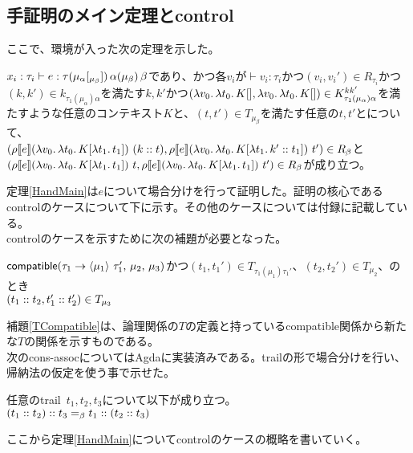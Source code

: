 \subsection{手証明のメイン定理とcontrol}
ここで、環境が入った次の定理を示した。
\begin{theorem}
  $x_i:\tau_i \vdash e:\tau \TrailsType{\alpha}{\beta} \TrailType{\beta}$であり、かつ各$v_i$が$\vdash v_i:\tau_i$かつ$(v_i,v_i') \in R_{\tau_i}$かつ$(k,k')\in k_{\tau_1(\mu_{\alpha})\alpha}$を満たす$k,k'$かつ$(\Lam{v_0}{\Lam{t_0}{K[]}}, \Lam{v_0}{\Lam{t_0}{K[]}})\in  K^{kk'}_{\tau_1(\mu_{\alpha})\alpha}$を満たすような任意のコンテキスト$K$と、$(t, t') \in T_{\mu_{\beta}}$を満たす任意の$t, t'$とについて、\\
  $(\rho \CPSTh{e} \LamP{v_0}{\Lam{t_0}{K[\Lam{t_1}{t_1}]}}\ \ConsP{k}{t}, \rho \CPSTh{e} \LamP{v_0}{\Lam{t_0}{K[\Lam{t_1}{\Cons{k'}{t_1}}]}}\ t')\in R_{\beta}$と\\
  $(\rho \CPSTh{e} \LamP{v_0}{\Lam{t_0}{K[\Lam{t_1}{t_1}]}}\ t, \rho \CPSTh{e} \LamP{v_0}{\Lam{t_0}{K[\Lam{t_1}{t_1}]}}\ t')\in R_{\beta}$が成り立つ。
\label{HandMain}
\end{theorem}
定理\ref{HandMain}は$e$について場合分けを行って証明した。証明の核心であるcontrolのケースについて下に示す。その他のケースについては付録に記載している。\\
controlのケースを示すために次の補題が必要となった。
\begin{lemma}
  $\Compatible{\Trail{\tau_1}{\tau_1'}{\mu_1}}{\mu_2}{\mu_3}$かつ$(t_1, t_1')\in T_{\tau_1(\mu_1)\tau_1'}、(t_2, t_2')\in T_{\mu_2}、$のとき\\
  $(\Cons{t_1}{t_2}, \Cons{t_1'}{t_2'})\in T_{\mu_3}$
\label{TCompatible}
\end{lemma}
補題\ref{TCompatible}は、論理関係の$T$の定義と持っている\textsf{compatible}関係から新たな$T$の関係を示すものである。\\
次の\textsf{cons-assoc}についてはAgdaに実装済みである。trailの形で場合分けを行い、帰納法の仮定を使う事で示せた。
\begin{lemma}
  任意のtrail\ $t_1,t_2,t_3$について以下が成り立つ。\\
  $\Cons{\ConsP{t_1}{t_2}}{t_3} =_{\beta} \Cons{t_1}{\ConsP{t_2}{t_3}}$
\label{ConsAssoc}
\end{lemma}
ここから定理\ref{HandMain}についてcontrolのケースの概略を書いていく。\\

